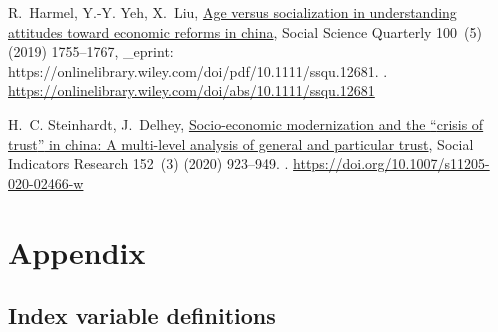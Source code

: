 \documentclass[
  number]{elsarticle}
\begin{document}
\begin{thebibliography}{10}
R.~Harmel, Y.-Y. Yeh, X.~Liu, \href{https://onlinelibrary.wiley.com/doi/abs/10.1111/ssqu.12681}{Age versus socialization in understanding attitudes toward economic reforms in china}, Social Science Quarterly 100~(5) (2019) 1755--1767, {\_}eprint: https://onlinelibrary.wiley.com/doi/pdf/10.1111/ssqu.12681.
\newblock \href {https://doi.org/10.1111/ssqu.12681} {}.
\newline\urlprefix\url{https://onlinelibrary.wiley.com/doi/abs/10.1111/ssqu.12681}

H.~C. Steinhardt, J.~Delhey, \href{https://doi.org/10.1007/s11205-020-02466-w}{Socio-economic modernization and the {\textquotedblleft}crisis of trust{\textquotedblright} in china: A multi-level analysis of general and particular trust}, Social Indicators Research 152~(3) (2020) 923--949.
\newblock \href {https://doi.org/10.1007/s11205-020-02466-w} {}.
\newline\urlprefix\url{https://doi.org/10.1007/s11205-020-02466-w}

\end{thebibliography}


\newpage{}

\section{Appendix}\label{sec-appendix}

\subsection{Index variable
definitions}\label{index-variable-definitions}

\begin{table}[H]

\caption{\label{tbl-tsindexvars}Tech savvy index variable construction}


\end{table}%
\end{document}
